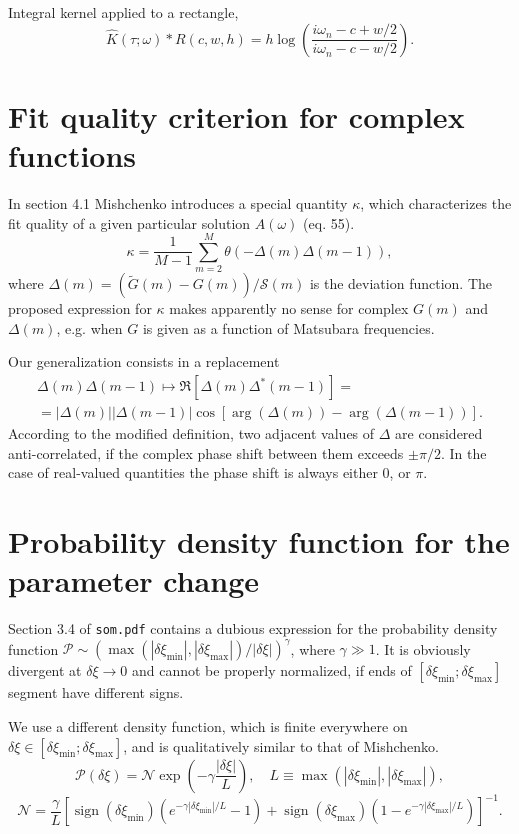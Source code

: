 \documentclass[]{article}
\DeclareMathOperator{\sign}{sign}
\begin{document}
Integral kernel applied to a rectangle,
\begin{equation}
	\hat K(\tau;\omega)*R(c,w,h) = 
	h \log\left(\frac{i\omega_n - c + w/2}{i\omega_n - c - w/2}\right).
\end{equation}

\section{Fit quality criterion for complex functions}

In section 4.1 Mishchenko introduces a special quantity $\kappa$, which characterizes the fit quality of a given particular solution
$A(\omega)$ (eq. 55).
\begin{equation}
	\kappa = \frac{1}{M-1}\sum_{m=2}^M\theta(-\Delta(m)\Delta(m-1)),
\end{equation}
where $\Delta(m) = (\tilde G(m) - G(m))/\mathcal{S}(m)$ is the deviation function. The proposed expression for $\kappa$ makes  apparently no sense for complex $G(m)$ and $\Delta(m)$, e.g. when $G$ is given as a function of Matsubara frequencies.

Our generalization consists in a replacement
\begin{multline}
	\Delta(m)\Delta(m-1) \mapsto \Re[\Delta(m)\Delta^*(m-1)] =\\=
	|\Delta(m)||\Delta(m-1)|\cos[\arg(\Delta(m)) - \arg(\Delta(m-1))].
\end{multline}
According to the modified definition, two adjacent values of $\Delta$ are considered anti-correlated, if the complex phase shift between them exceeds $\pm\pi/2$. In the case of real-valued quantities the phase shift is always either 0, or $\pi$.

\section{Probability density function for the parameter change}

Section 3.4 of \verb|som.pdf| contains a dubious expression for the probability
density function $\mathcal{P}\sim (\max(|\delta\xi_\mathrm{min}|, |\delta\xi_\mathrm{max}|)/|\delta\xi|)^\gamma$, where $\gamma\gg1$. It is
obviously divergent at $\delta\xi\to0$ and cannot be properly normalized, if
ends of $[\delta\xi_\mathrm{min};\delta\xi_\mathrm{max}]$ segment have different signs.

We use a different density function, which is finite everywhere on $\delta\xi\in[\delta\xi_\mathrm{min};\delta\xi_\mathrm{max}]$, and is qualitatively similar to that of Mishchenko.
\begin{equation}
	\mathcal{P}(\delta\xi) = \mathcal{N}
	\exp\left(-\gamma \frac{|\delta\xi|}{L}\right), \quad
	L \equiv \max(|\delta\xi_\mathrm{min}|, |\delta\xi_\mathrm{max}|),
\end{equation}
\begin{equation}
	\mathcal{N} = \frac{\gamma}{L}\left[
		\sign(\delta\xi_\mathrm{min})(e^{-\gamma|\delta\xi_\mathrm{min}|/L} - 1) +
		\sign(\delta\xi_\mathrm{max})(1 - e^{-\gamma|\delta\xi_\mathrm{max}|/L})
	\right]^{-1}.
\end{equation}
\end{document}

